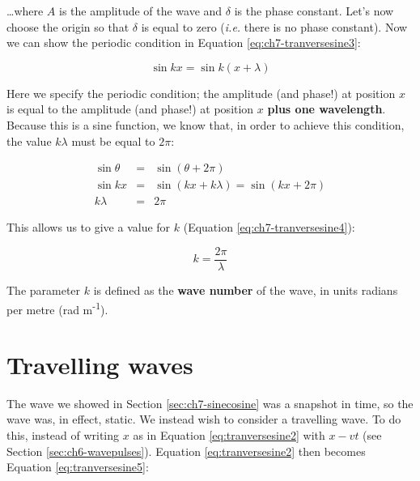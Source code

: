 \documentclass[
]{book}
\begin{document}
\ldots where \(A\) is the amplitude of the wave and \(\delta\) is the phase constant. Let's now choose the origin so that \(\delta\) is equal to zero (\emph{i.e.} there is no phase constant). Now we can show the periodic condition in Equation \eqref{eq:ch7-tranversesine3}:

\begin{equation}
\sin kx = \sin k(x+\lambda)
\label{eq:ch7-tranversesine3}
\end{equation}

Here we specify the periodic condition; the amplitude (and phase!) at position \(x\) is equal to the amplitude (and phase!) at position \(x\) \textbf{plus one wavelength}. Because this is a sine function, we know that, in order to achieve this condition, the value \(k\lambda\) must be equal to \(2\pi\):

\begin{equation}
\begin{array}{rcl}
\sin \theta &=& \sin \left( \theta + 2\pi \right)\\
\sin kx &=& \sin \left( kx + k\lambda\right) = \sin \left( kx + 2\pi \right) \\
k\lambda &=& 2\pi
\end{array}
\label{eq:ch7-tranvsersesine3b}
\end{equation}

This allows us to give a value for \(k\) (Equation \eqref{eq:ch7-tranversesine4}):

\begin{equation}
k = \frac{2\pi}{\lambda}
\label{eq:ch7-tranversesine4}
\end{equation}

The parameter \(k\) is defined as the \textbf{wave number} of the wave, in units radians per metre (rad m\textsuperscript{-1}).

\hypertarget{sec:ch7-travellingwaves}{%
\section{Travelling waves}\label{sec:ch7-travellingwaves}}

The wave we showed in Section \ref{sec:ch7-sinecosine} was a snapshot in time, so the wave was, in effect, static. We instead wish to consider a travelling wave. To do this, instead of writing \(x\) as in Equation \eqref{eq:tranversesine2} with \(x - vt\) (see Section \ref{sec:ch6-wavepulses}). Equation \eqref{eq:tranversesine2} then becomes Equation \eqref{eq:tranversesine5}:
\end{document}
